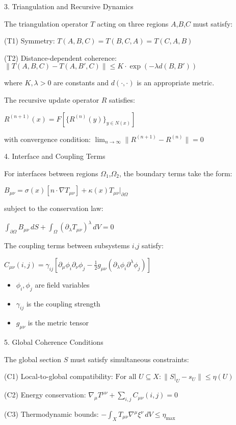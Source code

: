 \begin{refsection}
3. Triangulation and Recursive Dynamics

The triangulation operator $T$ acting on three regions $A$,$B$,$C$ must satisfy:

(T1) Symmetry: $T(A,B,C) = T(B,C,A) = T(C,A,B)$

(T2) Distance-dependent coherence:
$\|T(A,B,C) - T(A,B',C)\| \leq K \cdot \exp(-\lambda d(B,B'))$

where $K,\lambda > 0$ are constants and $d(\cdot,\cdot)$ is an appropriate metric.

The recursive update operator $R$ satisfies:

$R^{(n+1)}(x) = F[\{R^{(n)}(y)\}_{y \in N(x)}]$

with convergence condition:
$\lim_{n \rightarrow \infty} \|R^{(n+1)} - R^{(n)}\| = 0$

4. Interface and Coupling Terms

For interfaces between regions $\Omega_1$,$\Omega_2$, the boundary terms take the form:

$B_{\mu\nu} = \sigma(x)[n \cdot \nabla T_{\mu\nu}] + \kappa(x)T_{\mu\nu}|_{\partial\Omega}$

subject to the conservation law:

$\int_{\partial\Omega} B_{\mu\nu} \,dS + \int_\Omega (\partial_\lambda T_{\mu\nu})^\lambda \,dV = 0$

The coupling terms between subsystems $i$,$j$ satisfy:

$C_{\mu\nu}(i,j) = \gamma_{ij}[\partial_\mu\phi_i\partial_\nu\phi_j - \tfrac{1}{2}g_{\mu\nu}(\partial_\lambda\phi_i\partial^\lambda\phi_j)]$

\begin{itemize}
\item $\phi_i,\phi_j$ are field variables
\item $\gamma_{ij}$ is the coupling strength
\item $g_{\mu\nu}$ is the metric tensor
\end{itemize}

5. Global Coherence Conditions

The global section $S$ must satisfy simultaneous constraints:

(C1) Local-to-global compatibility:
$\text{For all } U \subseteq X: \|S|_U - s_U\| \leq \eta(U)$

(C2) Energy conservation:
$\nabla_\mu T^{\mu\nu} + \sum_{i,j} C_{\mu\nu}(i,j) = 0$

(C3) Thermodynamic bounds:
$-\int_X T_{\mu\nu}\nabla^\mu\xi^\nu \,dV \leq \eta_{\text{max}}$


\end{refsection}
